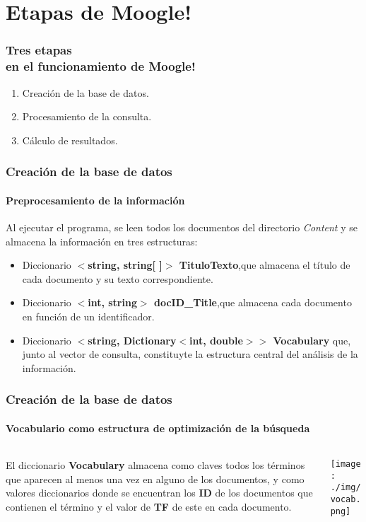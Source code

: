 \documentclass{beamer}
\begin{document}
\section{Etapas de Moogle!}
\begin{frame}
    \frametitle{\textbf{Tres etapas\\en el funcionamiento de Moogle!}}
    \begin{enumerate}
        \item Creaci\'on de la base de datos.
        \item Procesamiento de la consulta.
        \item C\'alculo de resultados.
    \end{enumerate}
    
\end{frame}
\begin{frame}
    \frametitle{Creaci\'on de la base de datos}
    \framesubtitle{Preprocesamiento de la informaci\'on}
    Al ejecutar el programa, se leen todos los documentos del directorio \textit{Content} y se almacena la informaci\'on en tres estructuras:
    \vspace{0.2cm}
    \begin{itemize}
        \item  \small Diccionario \textbf{$<$string, string[ ]$>$ TituloTexto},que almacena el t\'itulo de cada documento y su texto correspondiente.
        \item \small Diccionario \textbf{$<$int, string$>$ docID\_Title},que almacena cada documento en funci\'on de un identificador.
        \item Diccionario \textbf{$<$string, Dictionary$<$int, double$>>$ Vocabulary}
        que, junto al vector de consulta, constituyte la estructura central del an\'alisis
        de la informaci\'on.
    \end{itemize}
\end{frame}
\begin{frame}
    \frametitle{Creaci\'on de la base de datos}
    \framesubtitle{Vocabulario como estructura de optimizaci\'on de la b\'usqueda}
    \begin{columns}
        \begin{column}{0.5\textwidth}
            \centering
            \justifying
            El diccionario \textbf{Vocabulary} almacena como claves todos los t\'erminos que aparecen al menos una vez en alguno de los documentos, y como valores diccionarios donde se encuentran los \textbf{ID} de los documentos que contienen el t\'ermino y el valor de \textbf{TF} de este en cada documento. 
        \end{column}
        \begin{column}{0.5\textwidth}
            \texttt{[image: ./img/vocab.png]}
        \end{column}
    \end{columns}
\end{frame}
\end{document}
